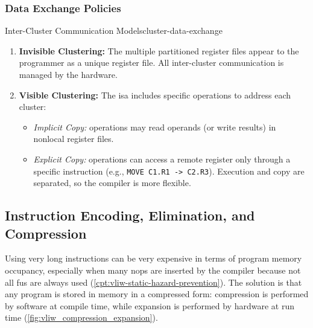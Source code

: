\subsubsection{Data Exchange Policies}
\begin{concept}{Inter-Cluster Communication Models}{cluster-data-exchange}
    \begin{enumerate}
        \item \textbf{Invisible Clustering:} The multiple partitioned register files appear to the programmer as a unique register file. All inter-cluster communication is managed by the hardware.
        \item \textbf{Visible Clustering:} The \gls{isa} includes specific operations to address each cluster:
        \begin{itemize}
            \item \textit{Implicit Copy:} operations may read operands (or write results) in nonlocal register files.
            \item \textit{Explicit Copy:} operations can access a remote register only through a specific instruction (e.g., \texttt{MOVE C1.R1 -> C2.R3}). Execution and copy are separated, so the compiler is more flexible.
        \end{itemize}
    \end{enumerate}
\end{concept}

\subsection{Instruction Encoding,  Elimination, and Compression}

Using very long instructions can be very expensive in terms of program memory occupancy, especially when many \glspl{nop} are inserted by the compiler because not all \glspl{fu} are always used (\cref{cpt:vliw-static-hazard-prevention}). The solution is that any program is stored in memory in a compressed form: compression is performed by software at compile time, while expansion is performed by hardware at run time (\cref{fig:vliw_compression_expansion}).

